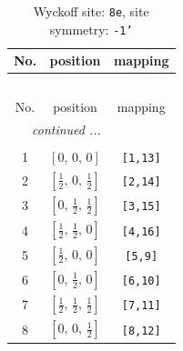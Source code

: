 \documentclass[fleqn,8pt]{jsarticle}
\begin{document}
\renewcommand{\arraystretch}{1.2}
\begin{longtable}{ccc}
\caption{Wyckoff site: {\tt 8e}, site symmetry: {\tt -1'}}
 \\
 \hline \hline
No. & position & mapping \\ \hline \endfirsthead

\multicolumn{2}{l}{\tablename\ \thetable{}} \\
 \hline \hline
No. & position & mapping \\ \hline \endhead

 \hline \hline
\multicolumn{2}{r}{\footnotesize\it continued ...} \\ \endfoot

 \hline \hline
\multicolumn{2}{r}{} \\ \endlastfoot

1 & $\left[ 0,\, 0,\, 0 \right]$ & {\tt [1,13]} \\ \hline
2 & $\left[ \frac{1}{2},\, 0,\, \frac{1}{2} \right]$ & {\tt [2,14]} \\ \hline
3 & $\left[ 0,\, \frac{1}{2},\, \frac{1}{2} \right]$ & {\tt [3,15]} \\ \hline
4 & $\left[ \frac{1}{2},\, \frac{1}{2},\, 0 \right]$ & {\tt [4,16]} \\ \hline
5 & $\left[ \frac{1}{2},\, 0,\, 0 \right]$ & {\tt [5,9]} \\ \hline
6 & $\left[ 0,\, \frac{1}{2},\, 0 \right]$ & {\tt [6,10]} \\ \hline
7 & $\left[ \frac{1}{2},\, \frac{1}{2},\, \frac{1}{2} \right]$ & {\tt [7,11]} \\ \hline
8 & $\left[ 0,\, 0,\, \frac{1}{2} \right]$ & {\tt [8,12]} \\
\end{longtable}
\renewcommand{\arraystretch}{1.2}
\end{document}
